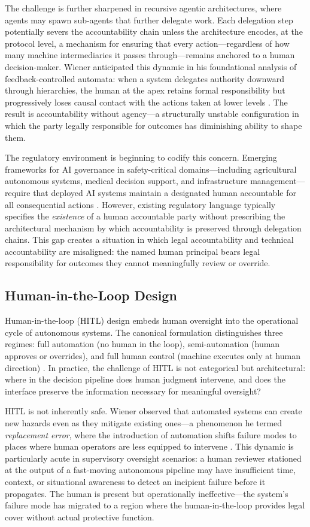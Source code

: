 The challenge is further sharpened in recursive agentic architectures, where agents may spawn sub-agents that further delegate work. Each delegation step potentially severs the accountability chain unless the architecture encodes, at the protocol level, a mechanism for ensuring that every action—regardless of how many machine intermediaries it passes through—remains anchored to a human decision-maker. Wiener anticipated this dynamic in his foundational analysis of feedback-controlled automata: when a system delegates authority downward through hierarchies, the human at the apex retains formal responsibility but progressively loses causal contact with the actions taken at lower levels \cite{wiener1948}. The result is accountability without agency—a structurally unstable configuration in which the party legally responsible for outcomes has diminishing ability to shape them.

The regulatory environment is beginning to codify this concern. Emerging frameworks for AI governance in safety-critical domains—including agricultural autonomous systems, medical decision support, and infrastructure management—require that deployed AI systems maintain a designated human accountable for all consequential actions \cite{bansal2019}. However, existing regulatory language typically specifies the \emph{existence} of a human accountable party without prescribing the architectural mechanism by which accountability is preserved through delegation chains. This gap creates a situation in which legal accountability and technical accountability are misaligned: the named human principal bears legal responsibility for outcomes they cannot meaningfully review or override.

\subsection{Human-in-the-Loop Design}

Human-in-the-loop (HITL) design embeds human oversight into the operational cycle of autonomous systems. The canonical formulation distinguishes three regimes: full automation (no human in the loop), semi-automation (human approves or overrides), and full human control (machine executes only at human direction) \cite{tristr81}. In practice, the challenge of HITL is not categorical but architectural: where in the decision pipeline does human judgment intervene, and does the interface preserve the information necessary for meaningful oversight?

HITL is not inherently safe. Wiener observed that automated systems can create new hazards even as they mitigate existing ones—a phenomenon he termed \emph{replacement error}, where the introduction of automation shifts failure modes to places where human operators are less equipped to intervene \cite{wiener1948}. This dynamic is particularly acute in supervisory oversight scenarios: a human reviewer stationed at the output of a fast-moving autonomous pipeline may have insufficient time, context, or situational awareness to detect an incipient failure before it propagates. The human is present but operationally ineffective—the system's failure mode has migrated to a region where the human-in-the-loop provides legal cover without actual protective function.

